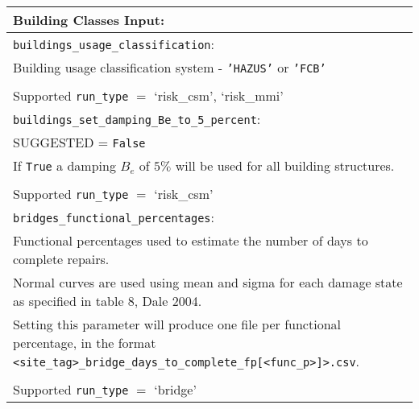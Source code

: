 \vspace{2em}
\begin{tabular}{|p{\textwidth}|}
\hline
\vspace{0.3em} \noindent \Large \textbf{Building Classes Input:} \normalsize \\
\hline \vspace{0.1em} \texttt{buildings\_usage\_classification}: \\
Building usage classification system - \texttt{'HAZUS'} or \texttt{'FCB'} \\
\\
Supported \texttt{run\_type} $=$ `risk\_csm', `risk\_mmi' \\
\hline \vspace{0.1em}
\texttt{buildings\_set\_damping\_Be\_to\_5\_percent}: \\
SUGGESTED = \texttt{False} \\
If \texttt{True} a damping $B_e$ of $5\%$ will be used for all building structures.\\
\\
Supported \texttt{run\_type} $=$ `risk\_csm' \\
\hline \vspace{0.1em}
\texttt{bridges\_functional\_percentages}: \\
Functional percentages used to estimate the number of days to complete repairs. \\
Normal curves are used using mean and sigma for each damage state as specified
in table 8, Dale 2004. \\
Setting this parameter will produce one file per functional percentage, in the 
format
\texttt{<site\_tag>\_}\texttt{bridge\_days\_to\_complete\_}\texttt{fp[<func\_p>]>}\texttt{.csv}. \\
\\
Supported \texttt{run\_type} $=$ `bridge' \\
\hline
 \end{tabular}

